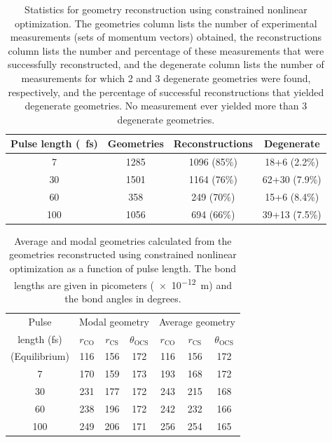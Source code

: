 \begin{table}
  \myfloatalign
  \centering
  \begin{tabularx}{\textwidth}{cccc}
    \toprule
    Pulse length (\SI{}{\fs}) & Geometries & Reconstructions & Degenerate \\
    \midrule
    7 & 1285 & 1096 (85\%) & 18+6 (2.2\%) \\
    30 & 1501 & 1164 (76\%) & 62+30 (7.9\%) \\
    60 & 358 & 249 (70\%) & 15+6 (8.4\%) \\
    100 & 1056 & 694 (66\%) & 39+13 (7.5\%) \\
    \bottomrule
  \end{tabularx}
  \caption[Statistics for geometry reconstruction using constrained nonlinear optimization as a function of pulse length.]
  {Statistics for geometry reconstruction using constrained nonlinear optimization. The geometries column lists the number of experimental measurements (sets of momentum vectors) obtained, the reconstructions column lists the number and percentage of these measurements that were successfully reconstructed, and the degenerate column lists the number of measurements for which 2 and 3 degenerate geometries were found, respectively, and the percentage of successful reconstructions that yielded degenerate geometries. No measurement ever yielded more than 3 degenerate geometries.}
  \label{table:MOSuccess}
\end{table}

\begin{table}
  \myfloatalign
  \centering
  \begin{tabularx}{0.85\textwidth}{ccccccc}
    \toprule
    Pulse & \multicolumn{3}{c}{Modal geometry} & \multicolumn{3}{c}{Average geometry} \\
    length (fs) & $r_\mathrm{CO}$ & $r_\mathrm{CS}$ & $\theta_\mathrm{OCS}$ & $r_\mathrm{CO}$ & $r_\mathrm{CS}$ & $\theta_\mathrm{OCS}$ \\
    \midrule
    (Equilibrium) & 116 & 156 & 172 & 116 & 156 & 172 \\
    7 & 170 & 159 & 173 & 193 & 168 & 172 \\
    30 & 231 & 177 & 172 & 243 & 215 & 168 \\
    60 & 238 & 196 & 172 & 242 & 232 & 166 \\
    100 & 249 & 206 & 171 & 256 & 254 & 165 \\
    \bottomrule
  \end{tabularx}
  \caption[Average and modal geometries reconstructed using constrained nonlinear optimization as a function of pulse length.]
  {Average and modal geometries calculated from the geometries reconstructed using constrained nonlinear optimization as a function of pulse length. The bond lengths are given in picometers (\SI{e-12}{\m}) and the bond angles in degrees.}
  \label{table:MOGeometries}
\end{table}

